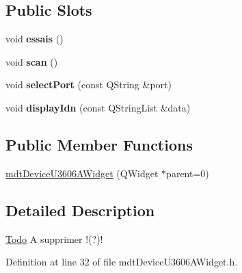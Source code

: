 \subsection*{Public Slots}
\begin{DoxyCompactItemize}
\item 
\hypertarget{classmdt_device_u3606_a_widget_aa232cf25e8ac0dee00cde5089af623b0}{
void {\bfseries essais} ()}
\label{classmdt_device_u3606_a_widget_aa232cf25e8ac0dee00cde5089af623b0}

\item 
\hypertarget{classmdt_device_u3606_a_widget_abc2b2860e71a9c79af6697205ead2a84}{
void {\bfseries scan} ()}
\label{classmdt_device_u3606_a_widget_abc2b2860e71a9c79af6697205ead2a84}

\item 
\hypertarget{classmdt_device_u3606_a_widget_a15409aed9aa73929b64be63db9f31f8e}{
void {\bfseries selectPort} (const QString \&port)}
\label{classmdt_device_u3606_a_widget_a15409aed9aa73929b64be63db9f31f8e}

\item 
\hypertarget{classmdt_device_u3606_a_widget_a3e979d85d5e198a97b36b4956d06ce8e}{
void {\bfseries displayIdn} (const QStringList \&data)}
\label{classmdt_device_u3606_a_widget_a3e979d85d5e198a97b36b4956d06ce8e}

\end{DoxyCompactItemize}
\subsection*{Public Member Functions}
\begin{DoxyCompactItemize}
\item 
\hyperlink{classmdt_device_u3606_a_widget_a653d85749d67555d8c3a43a779b6d2a2}{mdtDeviceU3606AWidget} (QWidget $\ast$parent=0)
\end{DoxyCompactItemize}


\subsection{Detailed Description}
\begin{Desc}
\item[\hyperlink{todo__todo000002}{Todo}]A supprimer !(?)! \end{Desc}


Definition at line 32 of file mdtDeviceU3606AWidget.h.



